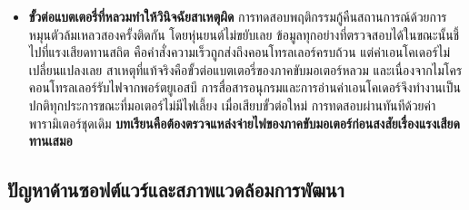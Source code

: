 \documentclass[a4paper,12pt]{report}
\begin{document}
\begin{itemize}[leftmargin=1.25cm, itemsep=6pt, topsep=6pt]
    \item \textbf{ขั้วต่อแบตเตอรี่ที่หลวมทำให้วินิจฉัยสาเหตุผิด}
    การทดสอบพฤติกรรมกู้คืนสถานการณ์ด้วยการหมุนตัวล้มเหลวสองครั้งติดกัน
    โดยหุ่นยนต์ไม่ขยับเลย ข้อมูลทุกอย่างที่ตรวจสอบได้ในขณะนั้นชี้ไปที่แรงเสียดทานสถิต
    คือคำสั่งความเร็วถูกส่งถึงคอนโทรลเลอร์ครบถ้วน แต่ค่าเอนโคเดอร์ไม่เปลี่ยนแปลงเลย
    สาเหตุที่แท้จริงคือขั้วต่อแบตเตอรี่ของภาคขับมอเตอร์หลวม
    และเนื่องจากไมโครคอนโทรลเลอร์รับไฟจากพอร์ตยูเอสบี
    การสื่อสารอนุกรมและการอ่านค่าเอนโคเดอร์จึงทำงานเป็นปกติทุกประการขณะที่มอเตอร์ไม่มีไฟเลี้ยง
    เมื่อเสียบขั้วต่อใหม่ การทดสอบผ่านทันทีด้วยค่าพารามิเตอร์ชุดเดิม
    \textbf{บทเรียนคือต้องตรวจแหล่งจ่ายไฟของภาคขับมอเตอร์ก่อนสงสัยเรื่องแรงเสียดทานเสมอ}
\end{itemize}

\subsection{ปัญหาด้านซอฟต์แวร์และสภาพแวดล้อมการพัฒนา}
\end{document}
